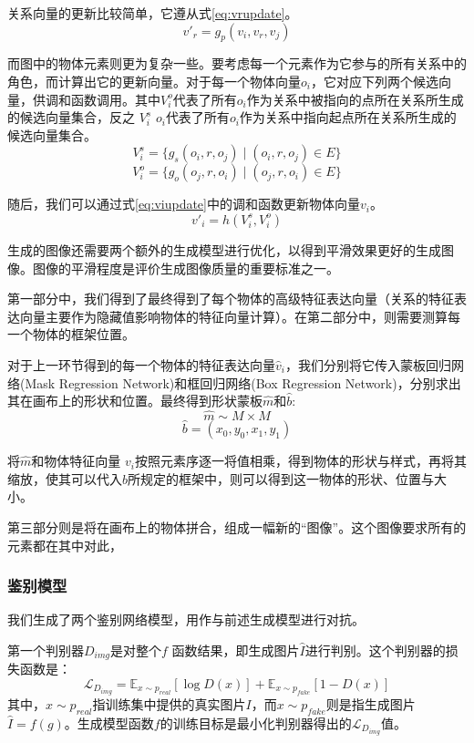 关系向量的更新比较简单，它遵从式\eqref{eq:vrupdate}。
\begin{equation}
    v'_r = g_p(v_i,v_r,v_j)
    \label{eq:vrupdate}
\end{equation}

而图中的物体元素则更为复杂一些。要考虑每一个元素作为它参与的所有关系中的角色，而计算出它的更新向量。对于每一个物体向量$o_i$，它对应下列两个候选向量，供调和函数调用。其中$V_i^o $代表了所有$o_i$作为关系中被指向的点所在关系所生成的候选向量集合，反之 $V_i^s$ $o_i$代表了所有$o_i$作为关系中指向起点所在关系所生成的候选向量集合。
$$V_i^s = \{g_s(o_i, r, o_j)\mid (o_i, r, o_j)\in E\}$$
$$V_i^o = \{g_o(o_j, r, o_i)\mid (o_j, r, o_i)\in E\}$$

随后，我们可以通过式\eqref{eq:viupdate}中的调和函数更新物体向量$ v_i $。
\begin{equation}
    v'_i = h(V_i^s, V_i^o)
    \label{eq:viupdate}
\end{equation}

生成的图像还需要两个额外的生成模型进行优化，以得到平滑效果更好的生成图像。图像的平滑程度是评价生成图像质量的重要标准之一。

第一部分中，我们得到了最终得到了每个物体的高级特征表达向量（关系的特征表达向量主要作为隐藏值影响物体的特征向量计算）。在第二部分中，则需要测算每一个物体的框架位置。

对于上一环节得到的每一个物体的特征表达向量$\hat{v}_i$，我们分别将它传入蒙板回归网络(Mask Regression Network)和框回归网络(Box Regression Network)，分别求出其在画布上的形状和位置。最终得到形状蒙板$\hat{m}$和$\hat{b}$:
$$\hat{m} \sim M \times M$$
$$\hat{b} = (x_0,y_0,x_1,y_1)$$

将$\hat{m} $和物体特征向量 $v_i $按照元素序逐一将值相乘，得到物体的形状与样式，再将其缩放，使其可以代入$\hat{b}$所规定的框架中，则可以得到这一物体的形状、位置与大小。

第三部分则是将在画布上的物体拼合，组成一幅新的“图像”。这个图像要求所有的元素都在其中对此，

\subsubsection{鉴别模型}
我们生成了两个鉴别网络模型，用作与前述生成模型进行对抗。

第一个判别器$D_{img}$是对整个$f$ 函数结果，即生成图片$\hat{I}$进行判别。这个判别器的损失函数是：
\begin{equation}
    \mathcal{L}_{D_{img}} = \mathbb{E}_{x\sim p_{real}} [\log D(x)] + \mathbb{E}_{x\sim p_{fake}} [1-D(x)]
    \label{eq:lossdimg}
\end{equation}
其中，$x\sim p_{real}$指训练集中提供的真实图片$I$，而$x\sim p_{fake}$则是指生成图片$\hat{I}=f(g)$。生成模型函数$f$的训练目标是最小化判别器得出的$\mathcal{L}_{D_{img}}$值。

